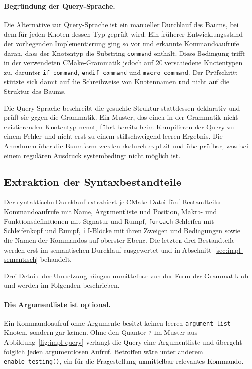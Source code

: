 \documentclass[12pt,a4paper,twoside,headsepline,parskip=half]{scrreprt}
\begin{document}
\paragraph{Begründung der Query-Sprache.}
Die Alternative zur Query-Sprache ist ein manueller Durchlauf des Baums, bei dem für
jeden Knoten dessen Typ geprüft wird. Ein früherer Entwicklungsstand der vorliegenden
Implementierung ging so vor und erkannte Kommandoaufrufe daran, dass der Knotentyp die
Substring \texttt{command} enthält. Diese Bedingung trifft in der verwendeten
CMake-Grammatik jedoch auf 20 verschiedene Knotentypen zu, darunter
\texttt{if\_command}, \texttt{endif\_command} und \texttt{macro\_command}. Der
Prüfschritt stützte sich damit auf die Schreibweise von Knotennamen und nicht auf die
Struktur des Baums.

Die Query-Sprache beschreibt die gesuchte Struktur stattdessen deklarativ und prüft
sie gegen die Grammatik. Ein Muster, das einen in der Grammatik nicht existierenden
Knotentyp nennt, führt bereits beim Kompilieren der Query zu einem Fehler und nicht
erst zu einem stillschweigend leeren Ergebnis. Die Annahmen über die Baumform werden
dadurch explizit und überprüfbar, was bei einem regulären Ausdruck systembedingt nicht
möglich ist.

\subsection{Extraktion der Syntaxbestandteile}
\label{sec:impl-extraktion}

Der syntaktische Durchlauf extrahiert je CMake-Datei fünf Bestandteile:
Kommandoaufrufe mit Name, Argumentliste und Position, Makro- und
Funktionsdefinitionen mit Signatur und Rumpf, \texttt{foreach}-Schleifen mit
Schleifenkopf und Rumpf, \texttt{if}-Blöcke mit ihren Zweigen und Bedingungen sowie
die Namen der Kommandos auf oberster Ebene. Die letzten drei Bestandteile werden erst
im semantischen Durchlauf ausgewertet und in Abschnitt~\ref{sec:impl-semantisch}
behandelt.

Drei Details der Umsetzung hängen unmittelbar von der Form der Grammatik ab und
werden im Folgenden beschrieben.

\paragraph{Die Argumentliste ist optional.}
Ein Kommandoaufruf ohne Argumente besitzt keinen leeren \texttt{argument\_list}-Knoten,
sondern gar keinen. Ohne den Quantor \texttt{?} im Muster aus
Abbildung~\ref{fig:impl-query} verlangt die Query eine Argumentliste und übergeht
folglich jeden argumentlosen Aufruf. Betroffen wäre unter anderem
\texttt{enable\_testing()}, ein für die Fragestellung unmittelbar relevantes
Kommando.
\end{document}
